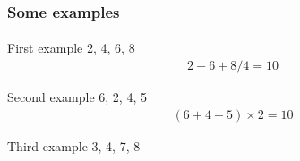 \documentclass{beamer}                             %
\begin{document}

\begin{frame}
\frametitle{Some examples}
\framesubtitle{}

\begin{exampleblock}{First example}
  2, 4, 6, 8
  \begin{gather*}
    2 + 6 + 8 / 4 = 10
  \end{gather*}
\end{exampleblock}

\begin{exampleblock}{Second example}
  6, 2, 4, 5
  \begin{gather*}
    (6 + 4 - 5) \times 2 = 10
  \end{gather*}
\end{exampleblock}

\begin{exampleblock}{Third example}
  3, 4, 7, 8
\end{exampleblock}
\end{frame}
\end{document}
